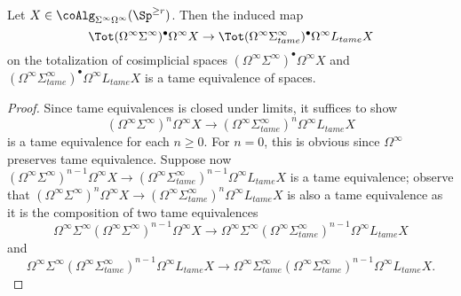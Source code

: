 \begin{lemma}
	\label{Lemma for the main theorem}
	Let $X\in \coAlg_{\Sigma^{\infty}\Omega^{\infty}}(\Sp^{\geq r})$. Then the induced map 	\[
	\Tot (\Omega^{\infty}\Sigma^{\infty})^{\bullet} \Omega^{\infty}X
	\to 
	\Tot (\Omega^{\infty}\Sigma^{\infty}_{tame})^{\bullet} \Omega^{\infty}L_{tame}X
	\]
	on the totalization of cosimplicial spaces $(\Omega^{\infty}\Sigma^{\infty})^{\bullet} \Omega^{\infty}X$ and $(\Omega^{\infty}\Sigma^{\infty}_{tame})^{\bullet} \Omega^{\infty}L_{tame}X$
	is a tame equivalence of spaces.
\end{lemma}
\begin{proof}
	Since tame equivalences is closed under limits, it suffices to show 
	\[
	(\Omega^{\infty}\Sigma^{\infty})^{n} \Omega^{\infty}X
	\to 
    (\Omega^{\infty}\Sigma^{\infty}_{tame})^{n} \Omega^{\infty}L_{tame}X
    \]
    is a tame equivalence for each $n\geq 0$.
    For $n=0$, this is obvious since $\Omega^{\infty}$ preserves tame equivalence. Suppose now 
    $(\Omega^{\infty}\Sigma^{\infty})^{n-1} \Omega^{\infty}X
	\to 
    (\Omega^{\infty}\Sigma^{\infty}_{tame})^{n-1} \Omega^{\infty}L_{tame}X$ is a tame equivalence;
    observe that $(\Omega^{\infty}\Sigma^{\infty})^{n} \Omega^{\infty}X
	\to 
    (\Omega^{\infty}\Sigma^{\infty}_{tame})^{n} \Omega^{\infty}L_{tame}X$ is also a tame equivalence as it is the composition of two tame equivalences
    $$ \Omega^{\infty}\Sigma^{\infty}(\Omega^{\infty}\Sigma^{\infty})^{n-1} \Omega^{\infty}X
	\to 
    \Omega^{\infty}\Sigma^{\infty}(\Omega^{\infty}\Sigma^{\infty}_{tame})^{n-1} \Omega^{\infty}L_{tame}X
    $$  
    and 
    $$\Omega^{\infty}\Sigma^{\infty}(\Omega^{\infty}\Sigma^{\infty}_{tame})^{n-1} \Omega^{\infty}L_{tame}X
    \to \Omega^{\infty}\Sigma^{\infty}_{tame}(\Omega^{\infty}\Sigma^{\infty}_{tame})^{n-1} \Omega^{\infty}L_{tame}X.$$
	\end{proof}

